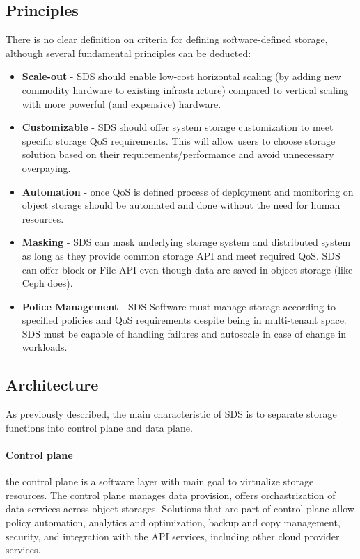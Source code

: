     \subsection*{Principles}
    There is no clear definition on criteria for defining software-defined storage, although several fundamental principles can be deducted\cite{sdsGPCloudStorage}:
    \begin{itemize}
        \item \textbf{Scale-out} - SDS should enable low-cost horizontal scaling (by adding new commodity hardware to existing infrastructure) compared to vertical scaling with more powerful (and expensive) hardware.
        \item \textbf{Customizable} - SDS should offer system storage customization to meet specific storage QoS requirements. This will allow users to choose storage solution based on their requirements/performance and avoid unnecessary overpaying.
        \item \textbf{Automation} - once QoS is defined process of deployment and monitoring on object storage should be automated and done without the need for human resources.
        \item \textbf{Masking} - SDS can mask underlying storage system and distributed system as long as they provide common storage API and meet required QoS. SDS can offer block or File API even though data are saved in object storage (like Ceph does).
        \item \textbf{Police Management} - SDS Software must manage storage according to specified policies and QoS requirements despite being in multi-tenant space. SDS must be capable of handling failures and autoscale in case of change in workloads.
    \end{itemize}


    \subsection*{Architecture}
    As previously described, the main characteristic of SDS is to separate storage functions into control plane and data plane.

    \paragraph{Control plane}
    the control plane is a software layer with main goal to virtualize storage resources. The control plane manages data provision, offers orchastrization of data services across object storages. Solutions that are part of control plane allow policy automation, analytics and optimization, backup and copy management, security, and integration with the API services, including other cloud provider services\cite{sdsIBMSDSGuide}.

